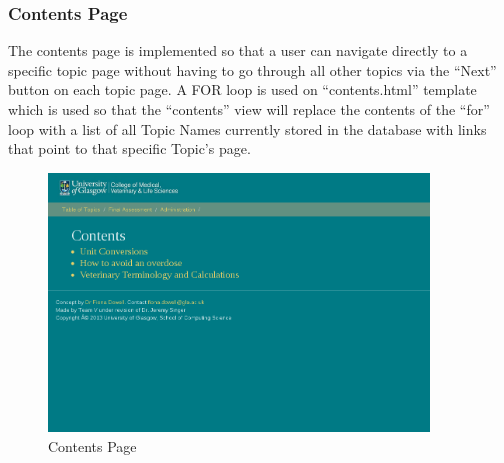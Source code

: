 \documentclass{l3proj}
\begin{document}
\subsubsection{Contents Page}
The contents page is implemented so that a user can navigate directly to a specific topic page without having to go through all other topics via the “Next” button on each topic page. A FOR loop is used on “contents.html” template which is used so that the “contents” view will replace the contents of the “for” loop with a list of all Topic Names currently stored in the database with links that point to that specific Topic’s page.
\begin{figure}[!htb]
\caption{Contents Page}
 \centering
\includegraphics[width=0.9\textwidth]{images/contentsPage.png}
\end{figure}
\end{document}
